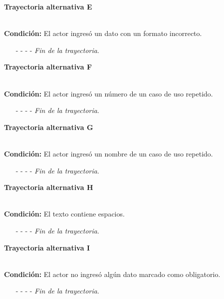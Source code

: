 \hypertarget{CU12-1:TAE}{\textbf{Trayectoria alternativa E}}\\
\noindent \textbf{Condición:} El actor ingresó un dato con un formato incorrecto.
\begin{enumerate}
	\UCpaso[\UCsist] Muestra el mensaje  señalando el campo que presenta el error en la pantalla .
	\UCpaso Regresa al paso \ref{CU12.1-P12} de la trayectoria principal.
	\item[- -] - - {\em {Fin de la trayectoria}}.
\end{enumerate}
\hypertarget{CU12-1:TAF}{\textbf{Trayectoria alternativa F}}\\
\noindent \textbf{Condición:} El actor ingresó un número de un caso de uso repetido.
\begin{enumerate}
	\UCpaso[\UCsist] Muestra el mensaje  señalando el campo que presenta la duplicidad en la pantalla .
	\UCpaso Regresa al paso \ref{CU12.1-P12} de la trayectoria principal.
	\item[- -] - - {\em {Fin de la trayectoria}}.
\end{enumerate}
\hypertarget{CU12-1:TAG}{\textbf{Trayectoria alternativa G}}\\
\noindent \textbf{Condición:} El actor ingresó un nombre de un caso de uso repetido.
\begin{enumerate}
	\UCpaso[\UCsist] Muestra el mensaje  señalando el campo que presenta la duplicidad en la pantalla .
	\UCpaso Regresa al paso \ref{CU12.1-P12} de la trayectoria principal.
	\item[- -] - - {\em {Fin de la trayectoria}}.
\end{enumerate}
\hypertarget{CU12-1:TAH}{\textbf{Trayectoria alternativa H}}\\
\noindent \textbf{Condición:} El texto contiene espacios.
\begin{enumerate}
	\UCpaso[\UCsist] Sustituye los espacios por guiones bajos.
	\UCpaso Continua en el \ref{CU12.1-TA1} de la trayectoria alternativa A.
	\item[- -] - - {\em {Fin de la trayectoria}}.
\end{enumerate}
\hypertarget{CU12-1:TAI}{\textbf{Trayectoria alternativa I}}\\
\noindent \textbf{Condición:} El actor no ingresó algún dato marcado como obligatorio.
\begin{enumerate}
	\UCpaso[\UCsist] Muestra el mensaje  en la pantalla .
	\UCpaso Continua en el paso \ref{CU12.1-P2} de la trayectoria principal.
	\item[- -] - - {\em {Fin de la trayectoria}}.%
\end{enumerate}